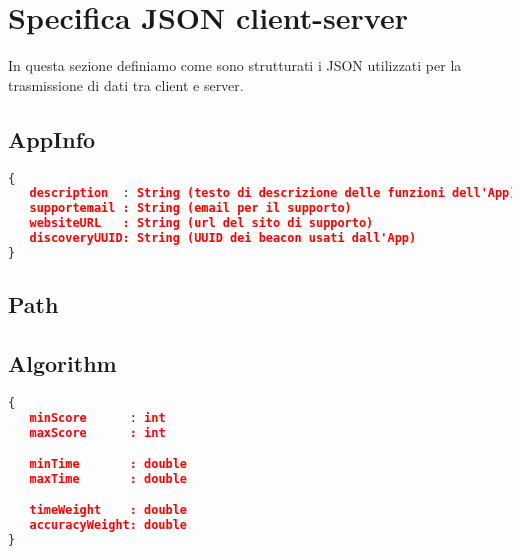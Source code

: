 \section{Specifica JSON client-server}
\label{sec:Specifica JSON client-server}

In questa sezione definiamo come sono strutturati i JSON utilizzati per la trasmissione di dati tra client e server.

\subsection{AppInfo}
\label{sub:AppInfo}
\begin{lstlisting}[language=json,firstnumber=1]
{
   description  : String (testo di descrizione delle funzioni dell'App)
   supportemail : String (email per il supporto)
   websiteURL   : String (url del sito di supporto)
   discoveryUUID: String (UUID dei beacon usati dall'App)
}
\end{lstlisting}



\subsection{Path}
\label{sub:Path}


\subsection{Algorithm}
\label{sub:Algorithm}
\begin{lstlisting}[language=json,firstnumber=1]
{
   minScore      : int
   maxScore      : int

   minTime       : double
   maxTime       : double

   timeWeight    : double
   accuracyWeight: double
}
\end{lstlisting}
